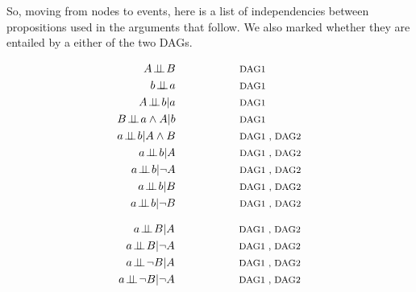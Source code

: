 \documentclass[
  10pt,
  dvipsnames,enabledeprecatedfontcommands]{scrartcl}
\newcommand{\indep}{\!\perp \!\!\! \perp\!}
\newcommand{\n}{\neg}
\newcommand{\et}{\wedge}
\begin{document}
So, moving from nodes to events, here is a list of independencies
between propositions used in the arguments that follow. We also marked
whether they are entailed by a either of the two DAGs.

\begin{figure}
\begin{subfigure}[!ht]{0.45\textwidth}
\begin{align} A\indep B  \label{eq:indAB}     &\hspace{2cm}\mbox{\footnotesize DAG1}\\
b \indep a   \label{eq:indab}   & \hspace{2cm}\mbox{\footnotesize DAG1}\\
A \indep b \vert a   \label{eq:I1}    &\hspace{2cm}\mbox{\footnotesize DAG1} \\
B \indep a \et A \vert b \label{eq:I2}&\hspace{2cm}\mbox{\footnotesize DAG1 } \\
a\indep b \vert A\et B \label{eq:I3}  &\hspace{2cm}\mbox{\footnotesize DAG1 , DAG2} \\  
a\indep b \vert A \label{eq:I3a}   &\hspace{2cm}\mbox{\footnotesize DAG1 , DAG2} \\ 
a\indep b \vert \n A \label{eq:I3b}   &\hspace{2cm}\mbox{\footnotesize DAG1 , DAG2} \\ 
a\indep b \vert B \label{eq:I3a2}   &\hspace{2cm}\mbox{\footnotesize DAG1 , DAG2} \\
a\indep b \vert \n B \label{eq:I3b2}   &\hspace{2cm}\mbox{\footnotesize DAG1 , DAG2}
\end{align}
\end{subfigure}
\begin{subfigure}[!ht]{0.5\textwidth}
\begin{align}
a\indep B \vert A \label{eq:I4}    & \hspace{2cm}\mbox{\footnotesize DAG1 , DAG2} \\
a\indep B \vert \n A \label{eq:I4a}    & \hspace{2cm}\mbox{\footnotesize DAG1 , DAG2} \\
a\indep \n B \vert A \label{eq:I4b}   & \hspace{2cm}\mbox{\footnotesize DAG1 , DAG2} \\
a\indep \n B \vert \n A \label{eq:I4c}   & \hspace{2cm}\mbox{\footnotesize DAG1 , DAG2} \\

\end{align}
\end{subfigure}
\end{figure}
\end{document}
